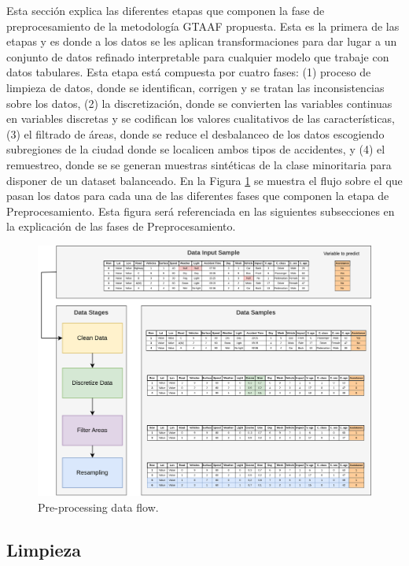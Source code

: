 \documentclass{uathesis-es}
\begin{document}
Esta sección explica las diferentes etapas que componen la fase de preprocesamiento de la metodología GTAAF propuesta. Esta es la primera de las etapas y es donde a los datos se les aplican transformaciones para dar lugar a un conjunto de datos refinado interpretable para cualquier modelo que trabaje con datos tabulares. Esta etapa está compuesta por cuatro fases: (1) proceso de limpieza de datos, donde se identifican, corrigen y se tratan las inconsistencias sobre los datos, (2) la discretización, donde se convierten las variables continuas en variables discretas y se codifican los valores cualitativos de las características, (3) el filtrado de áreas, donde se reduce el desbalanceo de los datos escogiendo subregiones de la ciudad donde se localicen ambos tipos de accidentes, y (4) el remuestreo, donde se se generan muestras sintéticas de la clase minoritaria para disponer de un dataset balanceado. En la Figura \ref{PreprocessingStage} se muestra el flujo sobre el que pasan los datos para cada una de las diferentes fases que componen la etapa de Preprocesamiento. Esta figura será referenciada en las siguientes subsecciones en la explicación de las fases de Preprocesamiento.

\begin{figure}[H]
    \centering
    \includegraphics[width=17cm]{Figures/Preprocessing.png}
    \caption{Pre-processing data flow.}
    \label{PreprocessingStage}
\end{figure}


\subsection{Limpieza}
\end{document}

